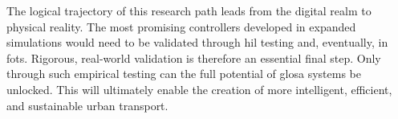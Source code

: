 The logical trajectory of this research path leads from the digital realm to physical reality. The most promising controllers developed in expanded simulations would need to be validated through \ac{hil} testing and, eventually, in \acp{fot}. Rigorous, real-world validation is therefore an essential final step. Only through such empirical testing can the full potential of \ac{glosa} systems be unlocked. This will ultimately enable the creation of more intelligent, efficient, and sustainable urban transport.